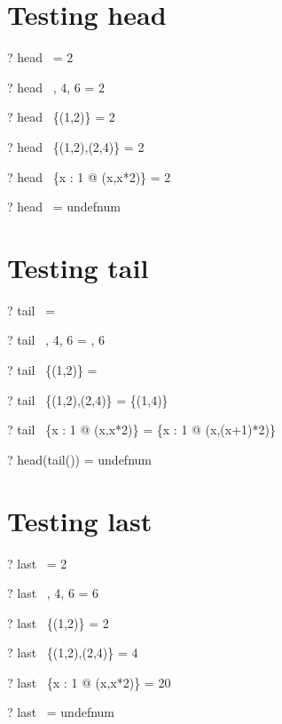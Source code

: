 \documentclass{article}
\begin{document}
\section{Testing head}
\begin{zed} \vdash? head~  \rangle = 2 \end{zed}
\begin{zed} \vdash? head~ , 4, 6 \rangle = 2 \end{zed}
\begin{zed} \vdash? head~ \{(1,2)\} = 2 \end{zed}
\begin{zed} \vdash? head~ \{(1,2),(2,4)\} = 2 \end{zed}
\begin{zed} \vdash? head~ \{x : 1  @ (x,x*2)\} = 2 \end{zed}
\begin{zed} \vdash? head~ \langle \rangle = undefnum \end{zed}

\section{Testing tail}
\begin{zed} \vdash? tail~  \rangle = \emptyset \end{zed}
\begin{zed} \vdash? tail~ , 4, 6 \rangle = , 6 \rangle \end{zed}
\begin{zed} \vdash? tail~ \{(1,2)\} = \emptyset \end{zed}
\begin{zed} \vdash? tail~ \{(1,2),(2,4)\} = \{(1,4)\} \end{zed}
\begin{zed} \vdash? tail~ \{x : 1  @ (x,x*2)\} = \{x : 1  @ (x,(x+1)*2)\} \end{zed}
\begin{zed} \vdash? head(tail(\emptyset[\nat \cross \num])) = undefnum \end{zed}

\section{Testing last}
\begin{zed} \vdash? last~  \rangle = 2 \end{zed}
\begin{zed} \vdash? last~ , 4, 6 \rangle = 6 \end{zed}
\begin{zed} \vdash? last~ \{(1,2)\} = 2 \end{zed}
\begin{zed} \vdash? last~ \{(1,2),(2,4)\} = 4 \end{zed}
\begin{zed} \vdash? last~ \{x : 1  @ (x,x*2)\} = 20 \end{zed}
\begin{zed} \vdash? last~ \emptyset[\nat \cross \num] = undefnum \end{zed}
\end{document}
